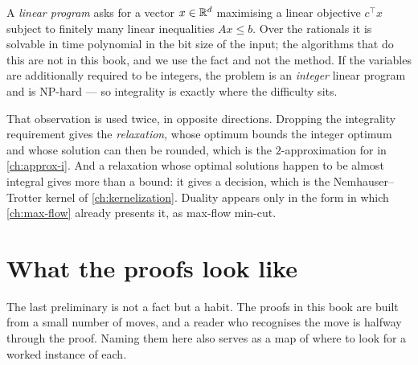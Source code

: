 A \emph{linear program} asks for a vector $x \in \mathbb{R}^{d}$ maximising a linear
objective $c^{\!\top} x$ subject to finitely many linear inequalities
$Ax \le b$. Over the rationals it is solvable in time polynomial in the bit
size of the input; the algorithms that do this are not in this book, and we use
the fact and not the method. If the variables are additionally required to be
integers, the problem is an \emph{integer} linear program and is
\textrm{NP}-hard --- so integrality is exactly where the difficulty sits.

That observation is used twice, in opposite directions. Dropping the
integrality requirement gives the \emph{relaxation}, whose optimum bounds the
integer optimum and whose solution can then be rounded, which is the
$2$-approximation for  in \cref{ch:approx-i}. And a
relaxation whose optimal solutions happen to be almost integral gives more than
a bound: it gives a decision, which is the Nemhauser--Trotter kernel of
\cref{ch:kernelization}. Duality appears only in the form in which
\cref{ch:max-flow} already presents it, as max-flow min-cut.

\section{What the proofs look like}
\label{sec:prelim-proofs}

The last preliminary is not a fact but a habit. The proofs in this book are
built from a small number of moves, and a reader who recognises the move is
halfway through the proof. Naming them here also serves as a map of where to
look for a worked instance of each.

